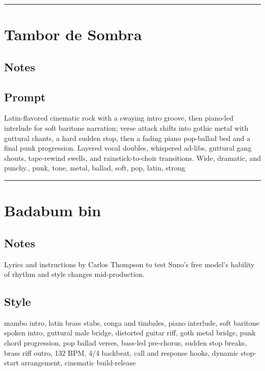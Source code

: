 \begin{center}\rule{0.5\linewidth}{0.5pt}\end{center}

\section{Tambor de Sombra}\label{tambor-de-sombra}

\subsection{Notes}\label{notes-22}

\subsection{Prompt}\label{prompt}

Latin-flavored cinematic rock with a swaying intro groove, then
piano-led interlude for soft baritone narration; verse attack shifts
into gothic metal with guttural chants, a hard sudden stop, then a
fading piano pop-ballad bed and a final punk progression. Layered vocal
doubles, whispered ad-libs, guttural gang shouts, tape-rewind swells,
and rainstick-to-choir transitions. Wide, dramatic, and punchy., punk,
tone, metal, ballad, soft, pop, latin, strong

\begin{center}\rule{0.5\linewidth}{0.5pt}\end{center}

\section{Badabum bin}\label{badabum-bin}

\subsection{Notes}\label{notes-23}

Lyrics and instructions by Carlos Thompson to test Suno's free model's
hability of rhythm and style changes mid-production.

\subsection{Style}\label{style-22}

mambo intro, latin brass stabs, conga and timbales, piano interlude,
soft baritone spoken intro, guttural male bridge, distorted guitar riff,
goth metal bridge, punk chord progression, pop ballad verses, bass-led
pre-chorus, sudden stop breaks, brass riff outro, 132 BPM, 4/4 backbeat,
call and response hooks, dynamic stop-start arrangement, cinematic
build-release

